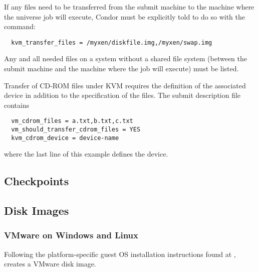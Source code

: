 If any files need to be transferred from the submit machine
to the machine where the  universe job will execute,
Condor must be explicitly told to do so with the
 command:
\footnotesize
\begin{verbatim}
  kvm_transfer_files = /myxen/diskfile.img,/myxen/swap.img
\end{verbatim}
\normalsize
Any and all needed files on a system without a shared file
system (between the submit machine and the machine where the
job will execute) must be listed.

Transfer of CD-ROM files under KVM requires the definition of
the associated device in addition to the specification of the
files.
The submit description file contains
\begin{verbatim}
  vm_cdrom_files = a.txt,b.txt,c.txt
  vm_should_transfer_cdrom_files = YES
  kvm_cdrom_device = device-name
\end{verbatim}
where the last line of this example defines the device.

\subsection{\label{sec:vm-checkpoints}Checkpoints}
\Todo

\subsection{\label{sec:vm-disk-image-details}Disk Images}

\subsubsection{\label{sec:vm-disk-image-details-vmware}
VMware on Windows and Linux}



Following the platform-specific
guest OS installation instructions found at
,
creates a VMware disk image.


